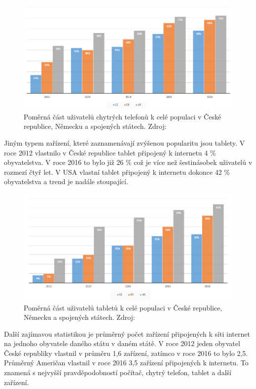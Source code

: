 \begin{figure}[h!]\label{uzivateleSmartphone}
\centering
\includegraphics[width=13cm]{img/uzivateleSmartphone}
\caption{Poměrná část uživatelů chytrých telefonů k celé populaci v České republice, Německu a spojených státech. Zdroj: } 
\end{figure}

Jiným typem zařízení, které zaznamenávají zvýšenou popularitu jsou tablety. V roce 2012 vlastnilo v České republice tablet připojený k internetu 4 \% obyvatelstva. V roce 2016 to bylo již 26 \% což je více než šestinásobek uživatelů v rozmezí čtyř let. V USA vlastní tablet připojený k internetu dokonce 42 \% obyvatelstva a trend je nadále stoupající. 

\begin{figure}[h!]\label{uzivateleTablet}
\centering
\includegraphics[width=13cm]{img/uzivateleTablet}
\caption{Poměrná část uživatelů tabletů k celé populaci v České republice, Německu a spojených státech. Zdroj: } 
\end{figure}

Další zajímavou statistikou je průměrný počet zařízení připojených k síti internet na jednoho obyvatele daného státu v daném státě. V roce 2012 jeden obyvatel České republiky vlastnil v průměru 1,6 zařízení, zatímco v roce 2016 to bylo 2,5. Průměrný Američan vlastnil v roce 2016 3,5 zařízení připojených k internetu. To znamená s nejvyšší pravděpodobností počítač, chytrý telefon, tablet a další zařízení.

